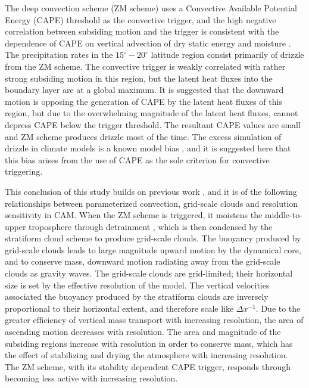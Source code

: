 The \cite{ZM1995AO} deep convection scheme (ZM scheme) uses a Convective Available Potential Energy (CAPE) threshold as the convective trigger, and the high negative correlation between subsiding motion and the trigger is consistent with the dependence of CAPE on vertical advection of dry static energy and moisture \citep{Z2002JGR}. The precipitation rates in the $15^{\circ} - 20^{\circ}$ latitude region consist primarily of drizzle from the ZM scheme. The convective trigger is weakly correlated with rather strong subsiding motion in this region, but the latent heat fluxes into the boundary layer are at a global maximum. It is suggested that the downward motion is opposing the generation of CAPE by the latent heat fluxes of this region, but due to the overwhelming magnitude of the latent heat fluxes, cannot depress CAPE below the trigger threshold. The resultant CAPE values are small and ZM scheme produces drizzle most of the time. The excess simulation of drizzle in climate models is a known model bias \citep{D2006JCLIM}, and it is suggested here that this bias arises from the use of CAPE as the sole criterion for convective triggering.

This conclusion of this study builds on previous work \citep[][Herrington et al., {\em{in review}}]{HR2017JCLIM,HR2018JAMES}, and it is of the following relationships between parameterized convection, grid-scale clouds and resolution sensitivity in CAM. When the ZM scheme is triggered, it moistens the middle-to-upper troposphere through detrainment \citep{ZM1995AO}, which is then condensed by the stratiform cloud scheme to produce grid-scale clouds. The buoyancy produced by grid-scale clouds leads to large magnitude upward motion by the dynamical core, and to conserve mass, downward motion radiating away from the grid-scale clouds as gravity waves. The grid-scale clouds are grid-limited; their horizontal size is set by the effective resolution of the model. The vertical velocities associated the buoyancy produced by the stratiform clouds are inversely proportional to their horizontal extent, and therefore scale like $\Delta x^{-1}$. Due to the greater efficiency of vertical mass transport with increasing resolution, the area of ascending motion decreases with resolution. The area and magnitude of the subsiding regions increase with resolution in order to conserve mass, which has the effect of stabilizing and drying the atmosphere with increasing resolution. The ZM scheme, with its stability dependent CAPE trigger, responds through becoming less active with increasing resolution.

